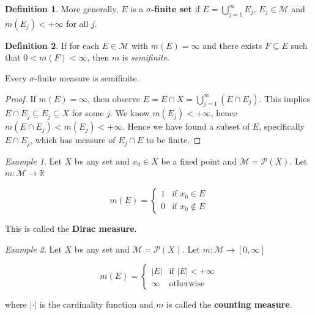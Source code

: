 \documentclass[11pt]{article}
\theoremstyle{definition}
\newtheorem{definition}{Definition}[section]
\theoremstyle{remark}
\newtheorem{example}{Example}[section]
\begin{document}
\begin{definition}\label{def:sigma_finite_set}
More generally, $E$ is a \textbf{$\sigma$-finite set} if $E = \bigcup_{j=1}^{\infty} E_j$, $E_j \in \mathcal{M}$ and $m(E_j) < +\infty$ for all $j$.
\end{definition}

\begin{definition}\label{def:semifinite}
If for each $E \in \mathcal{M}$ with $m(E) = \infty$ and there exists $F \subseteq E$ such that $0 < m(F) < \infty$, then $m$ is \emph{semifinite}.
\end{definition}

\begin{exercise}
Every $\sigma$-finite measure is semifinite.
\end{exercise}

\begin{proof}
If $m(E) = \infty$, then observe $E = E \cap X = \bigcup_{j=1}^{\infty} (E \cap E_j)$.
This implies $E \cap E_j \subseteq E_j \subseteq X$ for some $j$. We know $m(E_j) < +\infty$, hence
$m(E \cap E_j) < m(E_j) < +\infty$. Hence we have found a subset of $E$, specifically $E \cap E_j$, which has measure of $E_j \cap E$ to be finite.
\end{proof}

\begin{example}\label{ex:dirac_measure}
Let $X$ be any set and $x_0 \in X$ be a fixed point and $\mathcal{M} = \mathcal{P}(X)$. Let $m : \mathcal{M} \to \mathbb{R}$

\[
m(E) = \begin{cases}
1 & \text{if } x_0 \in E \\
0 & \text{if } x_0 \notin E
\end{cases}
\]

This is called the \textbf{Dirac measure}.
\end{example}

\begin{example}\label{ex:counting_measure}
Let $X$ be any set and $\mathcal{M} = \mathcal{P}(X)$. Let $m : \mathcal{M} \to [0, \infty]$

\[
m(E) = \begin{cases}
|E| & \text{if } |E| < +\infty \\
\infty & \text{otherwise}
\end{cases}
\]

where $| \cdot |$ is the cardinality function and $m$ is called the \textbf{counting measure}.
\end{example}
\end{document}
